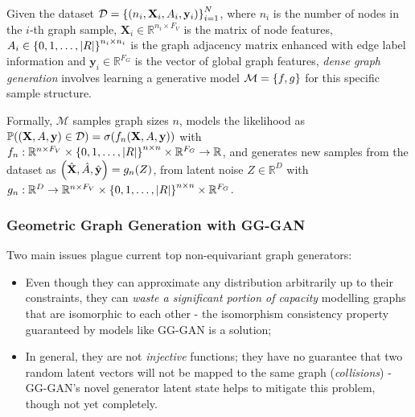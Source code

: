 \begin{definition}
Given the dataset $\mathcal{D}=\mathopen{}\left\{\mathopen{}\left(n_i,\mathbf{X}_i,A_i,\mathbf{y}_i\right)\right\}_{i=1}^{N}$, where $n_i$ is the number of nodes in the $i$-th graph sample, $\mathbf{X}_i \in \mathbb{R}^{n_i \times F_V}$ is the matrix of node features, $A_i \in \mathopen{}\left\{0,1,\dots,\mathopen{}\left|R\right|\right\}^{n_i \times n_i}$ is the graph adjacency matrix enhanced with edge label information and $\mathbf{y}_i \in \mathbb{R}^{F_G}$ is the vector of global graph features, \emph{dense graph generation} involves learning a generative model $\mathcal{M}=\mathopen{}\left\{f,g\right\}$ for this specific sample structure. 

Formally, $\mathcal{M}$ samples graph sizes $n$, models the likelihood as $\mathbb{P}\mathopen{}\left(\mathopen{}\left(\mathbf{X},A,\mathbf{y}\right) \in \mathcal{D}\right)=\sigma\mathopen{}\left(f_n\mathopen{}\left(\mathbf{X},A,\mathbf{y}\right)\right)$ with $f_n: \mathbb{R}^{n \times F_V} \times \mathopen{}\left\{0,1,\dots,\mathopen{}\left|R\right|\right\}^{n \times n} \times \mathbb{R}^{F_G} \to \mathbb{R}$, and generates new samples from the dataset as $\mathopen{}\left(\hat{\mathbf{X}},\hat{A},\hat{\mathbf{y}}\right)=g_n\mathopen{}\left(Z\right)$, from latent noise $Z\in\mathbb{R}^D$ with $g_n:\mathbb{R}^D \to \mathbb{R}^{n \times F_V} \times \mathopen{}\left\{0,1,\dots,\mathopen{}\left|R\right|\right\}^{n \times n} \times \mathbb{R}^{F_G}$.
\end{definition}

\subsubsection{Geometric Graph Generation with GG-GAN}
Two main issues plague current top non-equivariant graph generators: 
\begin{itemize}
\item Even though they can approximate any distribution arbitrarily up to their constraints, they can \emph{waste a significant portion of capacity} modelling graphs that are isomorphic to each other - the isomorphism consistency property guaranteed by models like GG-GAN is a solution;
\item In general, they are not \emph{injective} functions; they have no guarantee that two random latent vectors will not be mapped to the same graph (\emph{collisions}) - GG-GAN's novel generator latent state helps to mitigate this problem, though not yet completely.  
\end{itemize}

